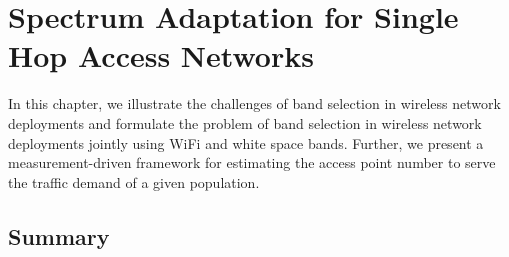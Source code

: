 \chapter{Spectrum Adaptation for Single Hop Access Networks} 
\label{ch:winmee}

In this chapter, we illustrate the challenges of band selection
in wireless network deployments and formulate the problem of band 
selection in wireless network deployments jointly using WiFi and white space bands. 
Further, we present a measurement-driven framework for estimating the 
access point number to serve the traffic demand of a given population.













\section{Summary}
\label{sec:winmeeconclusion}

